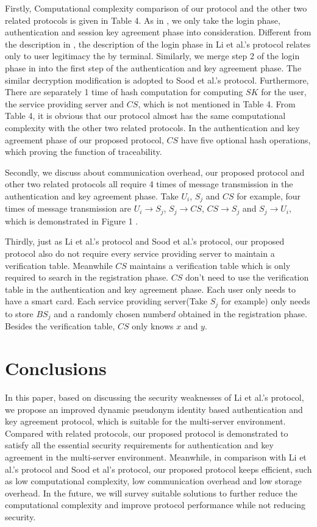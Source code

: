 \documentclass[preprint,12pt]{elsarticle}
\begin{document}
Firstly, Computational complexity comparison of our protocol and the other two related protocols is given in Table 4. As in \cite{passwd-based-multi7}, we only take the login phase, authentication and session key agreement phase into consideration. Different from the description in \cite{passwd-based-multi7}, the description of the login phase in Li et al.'s protocol relates only to user legitimacy the by terminal. Similarly, we merge step 2 of the login phase in \cite{passwd-based-multi7} into the first step of the authentication and key agreement phase. The similar decryption modification is adopted to Sood et al.'s protocol\cite{passwd-based-multi2}. Furthermore, There are separately 1 time of hash computation for computing $SK$ for the user, the service providing server and $CS$, which is not mentioned in Table 4. From Table 4, it is obvious that our protocol almost has the same computational complexity with the other two related protocols. In the authentication and key agreement phase of our proposed protocol, $CS$ have five optional hash operations, which proving the function of traceability.

Secondly, we discuss about communication overhead, our proposed protocol and other two related protocols all require 4 times of message transmission in the authentication and key agreement phase. Take $U_i$, $S_j$ and $CS$ for example, four times of message transmission are $U_i\rightarrow S_j$, $S_j\rightarrow CS$, $CS\rightarrow S_j$ and $S_j\rightarrow U_i$, which is demonstrated in Figure 1 .

Thirdly, just as Li et al.'s protocol and Sood et al.'s protocol, our proposed protocol also do not require every service providing server to maintain a verification table. Meanwhile $CS$ maintains a verification table which is only required to search in the registration phase. $CS$ don't need to use the verification table in the authentication and key agreement phase. Each user only needs to have a smart card. Each service providing server(Take $S_j$ for example) only needs to store $BS_j$ and a randomly chosen number$d$ obtained in the registration phase. Besides the verification table, $CS$ only knows $x$ and $y$.


\section{Conclusions}
In this paper, based on discussing the security weaknesses of Li et al.'s protocol, we propose an improved dynamic pseudonym identity based authentication and key agreement protocol, which is suitable for the multi-server environment. Compared with related protocols, our proposed protocol is demonstrated to satisfy all the essential security requirements for authentication and key agreement in the multi-server environment. Meanwhile, in comparison with Li et al.'s protocol and Sood et al's protocol, our proposed protocol keeps efficient, such as low computational complexity, low communication overhead and low storage overhead. In the future, we will survey suitable solutions to further reduce the computational complexity and improve protocol performance while not reducing security.
\end{document}
